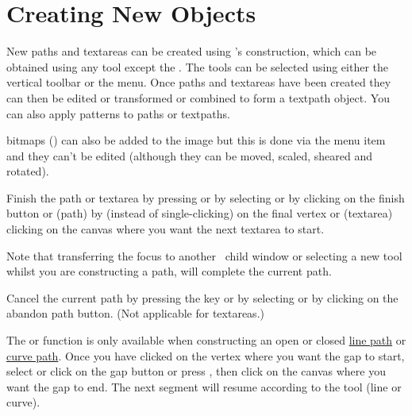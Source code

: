 \chapter{Creating New Objects}\label{sec:newobjects}


New \glspl{path} and \glspl{textarea} can be created using
\FlowframTk's \gls{construction}, which can be obtained using any tool
except the . The tools can be selected using either the
vertical \gls{toolbar} or the  menu. Once \glspl{path}
and \glspl{textarea} have been created they can then be edited or
transformed or combined to form a \gls{textpath} object. You can
also apply patterns to \glspl{path} or \glspl{textpath}.

\Glspl{bitmap} () can also be added to
the image but this is done via the  menu item
and they can't be edited (although they can be moved, scaled,
sheared and rotated).


Finish the \gls{path} or \gls{textarea} by pressing
 or by selecting 
or by clicking on the finish button or (\gls{path}) by
 (instead of single-clicking)
on the final vertex or (\gls{textarea}) clicking on the \gls{canvas}
where you want the next \gls{textarea} to start.  

Note that transferring the focus to
another \FlowframTk\ child window or selecting a new tool whilst you
are constructing a \gls{path}, will complete the current path.


Cancel the current \gls{path} by pressing the
 key or by selecting
 or by clicking on the abandon path button.
(Not applicable for \glspl{textarea}.)


The  or  function is only
available when constructing an open or closed
\hyperref[sec:newlinepath]{line path} or \hyperref[sec:newcurvepath]{curve
path}.  Once you have clicked on the vertex where you want the
\gls{gap} to start, select  or click on the
\gls{gap} button or press , then click
on the \gls{canvas} where you want the \gls{gap} to end. The next
segment will resume according to the tool (line or curve).


